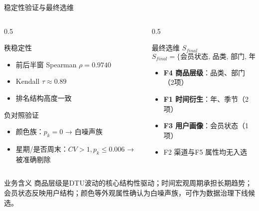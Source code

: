 \documentclass{beamer}
\begin{document}
\begin{frame}{稳定性验证与最终选维}
    \begin{columns}[T]
        \begin{column}{0.5\textwidth}
            \begin{block}{秩稳定性}
                \begin{itemize}
                    \item 前后半窗 Spearman $\rho = 0.9740$
                    \item Kendall $\tau \approx 0.89$
                    \item 排名结构高度一致
                \end{itemize}
            \end{block}
            \begin{block}{负对照验证}
                \begin{itemize}
                    \item 颜色族：$p_k = 0$ → 白噪声族
                    \item 星期/是否周末：$CV > 1, p_k \leq 0.006$ → 被准确剔除
                \end{itemize}
            \end{block}
        \end{column}
        \begin{column}{0.5\textwidth}
            \begin{block}{最终选维 $S_{final}$}
                \vspace{-0.2cm}
                \begin{equation*}
                    S_{final} = \{\text{会员状态, 品类, 部门, 年, 季节}\}
                \end{equation*}
                \vspace{-0.2cm}
                \begin{itemize}
                    \item \textbf{F4 商品层级}：品类、部门（2项）
                    \item \textbf{F1 时间衍生}：年、季节（2项）
                    \item \textbf{F3 用户画像}：会员状态（1项）
                    \item F2 渠道与F5 属性均无入选
                \end{itemize}
            \end{block}
        \end{column}
    \end{columns}
    
    \begin{block}{业务含义}
        商品层级是DTU波动的核心结构性驱动；时间宏观周期承担长期趋势；会员状态反映用户结构；颜色等外观属性确认为白噪声族，可作为数据治理下线候选。
    \end{block}
\end{frame}
\end{document}
